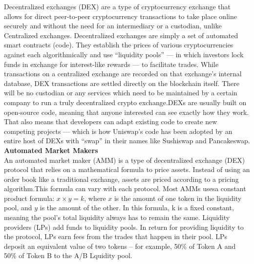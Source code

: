 \documentclass[conference]{IEEEtran}
\begin{document}
Decentralized exchanges (DEX) are a type of cryptocurrency exchange that allows for direct peer-to-peer cryptocurrency transactions to take place online securely and without the need for an intermediary or a custodian, unlike Centralized exchanges. Decentralized exchanges are simply a set of automated smart contracts (code). They establish the prices of various cryptocurrencies against each algorithmically and use “liquidity pools” — in which investors lock funds in exchange for interest-like rewards — to facilitate trades. While transactions on a centralized exchange are recorded on that exchange’s internal database, DEX transactions are settled directly on the blockchain itself. There will be no custodian or any services which need to be maintained by a certain company to run a truly decentralized crypto exchange.DEXs are usually built on open-source code, meaning that anyone interested can see exactly how they work. That also means that developers can adapt existing code to create new competing projects — which is how Uniswap’s code has been adopted by an entire host of DEXs with “swap” in their names like Sushiswap and Pancakeswap.\\

\textbf{Automated Market Makers}\\

An automated market maker (AMM) is a type of decentralized exchange (DEX) protocol that relies on a mathematical formula to price assets. Instead of using an order book like a traditional exchange, assets are priced according to a pricing algorithm.This formula can vary with each protocol. Most AMMs usesa constant product formula: $x  \times  y = k$, where $x$ is the amount of one token in the liquidity pool, and $y$ is the amount of the other. In this formula, k is a fixed constant, meaning the pool’s total liquidity always has to remain the same. Liquidity providers (LPs) add funds to liquidity pools. In return for providing liquidity to the protocol, LPs earn fees from the trades that happen in their pool. LPs deposit an equivalent value of two tokens – for example, 50\% of Token A and 50\% of Token B to the A/B Lquidity pool.\\
\end{document}
